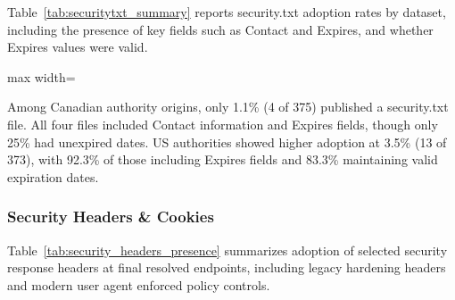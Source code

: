 \documentclass[conference]{IEEEtran}
\begin{document}
Table~\ref{tab:securitytxt_summary} reports security.txt adoption rates by dataset, including the presence of 
key fields such as Contact and Expires, and whether Expires values were valid.

\begin{table}[t]
  \caption{Security.txt adoption and field completeness by dataset.}
  \label{tab:securitytxt_summary}
  \centering
  \scriptsize
  \setlength{\tabcolsep}{2.2pt} 
  \renewcommand{\arraystretch}{1.15}

  \begin{adjustbox}{max width=\columnwidth}
  \end{adjustbox}
\end{table}

Among Canadian authority origins, only 1.1\% (4 of 375) 
published a security.txt file. All four files included Contact information and Expires fields, 
though only 25\% had unexpired dates. US authorities showed higher adoption at 3.5\% (13 of 373), 
with 92.3\% of those including Expires fields and 83.3\% maintaining valid expiration dates. 


\subsubsection{Security Headers \& Cookies}

Table~\ref{tab:security_headers_presence} summarizes adoption of selected security response
 headers at final resolved endpoints, including legacy hardening headers and modern user agent enforced policy controls.
\end{document}
